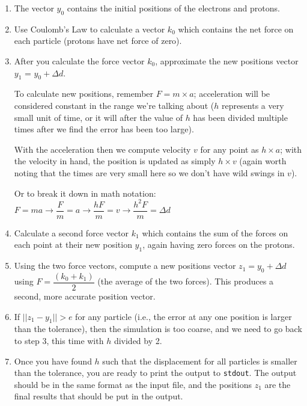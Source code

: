 \documentclass[letterpaper,10pt]{article}
\begin{document}
\begin{enumerate}
\item The vector $y_{0}$ contains the initial positions of the electrons and protons.

\item Use Coulomb's Law to calculate a vector $k_{0}$ which contains the net force on each particle (protons have net force of zero).

\item After you calculate the force vector $k_0$, approximate the new positions vector $y_{1}$ = $y_{0} + \Delta d$.

To calculate new positions, remember $F = m \times a$;  acceleration will be considered constant in the range we're talking about ($h$ represents a very small unit of time, or it will after the value of $h$ has been divided multiple times after we find the error has been too large). 

With the acceleration then we compute velocity $v$ for any point as $h \times a$; with the velocity in hand, the position is updated as simply $h \times v$ (again worth noting that the times are very small here so we don't have wild swings in $v$). 

Or to break it down in math notation: $F = ma \rightarrow \dfrac{F}{m} = a \rightarrow \dfrac{hF}{m} = v \rightarrow \dfrac{h^{2}F}{m} = \Delta d$

\item Calculate a second force vector $k_{1}$ which contains the sum of the forces on each point at their new position $y_{1}$, again having zero forces on the protons.

\item Using the two force vectors, compute a new positions vector $z_{1} = y_0 + \Delta d$ using $F = \dfrac{( k_{0} + k_{1} )}{2}$ (the average of the two forces). This produces a second, more accurate position vector.

\item If $||z_{1} - y_{1}|| > e$ for any particle (i.e., the error at any one position is larger than the tolerance), then the simulation is too coarse, and we need to go back to step 3, this time with $h$ divided by 2.

\item Once you have found $h$ such that the displacement for all particles is smaller than the tolerance, you are ready to print the output to \texttt{stdout}. The output should be in the same format as the input file, and the positions $z_{1}$ are the final results that should be put in the output. 

\end{enumerate}
\end{document}
